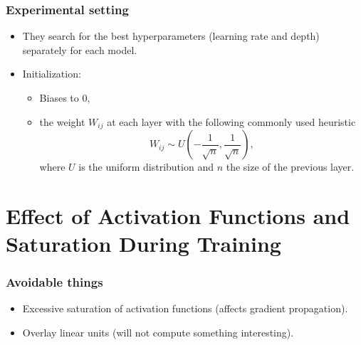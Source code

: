 \begin{frame}
  \frametitle{Experimental setting}

  \begin{itemize}
    \item They search for the best hyperparameters (learning rate and depth) separately for each model. 
    \item Initialization: 
    \begin{itemize}
      \item Biases to 0,
      \item the weight $W_{i j}$ at each layer with the following commonly used heuristic 
      \begin{equation}
        W_{i j} \sim U \left( - \frac{1}{\sqrt{n}}, \frac{1}{\sqrt{n}}\right), 
      \end{equation}
      where $U$ is the uniform distribution and $n$ the size of the previous layer. 
    \end{itemize}
  \end{itemize}

\end{frame}

\section{Effect of Activation Functions and Saturation During Training}

\begin{frame}
  \frametitle{Avoidable things}
\begin{itemize}
  \item Excessive saturation of activation functions (affects gradient propagation). 
  \item Overlay linear units  (will not compute something interesting).
\end{itemize}
\end{frame}

